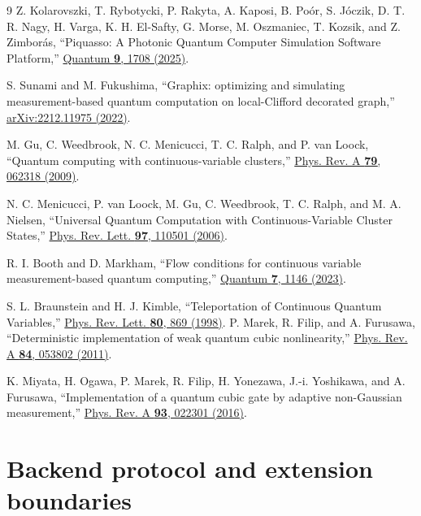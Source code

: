 \documentclass[a4paper,twocolumn,11pt,nopdfoutputerror]{quantumarticle}
\begin{document}
\begin{thebibliography}{9}
Z. Kolarovszki, T. Rybotycki, P. Rakyta, A. Kaposi, B. Po\'or, S. J\'oczik,
D. T. R. Nagy, H. Varga, K. H. El-Safty, G. Morse, M. Oszmaniec, T. Kozsik,
and Z. Zimbor\'as,
``Piquasso: A Photonic Quantum Computer Simulation Software Platform,''
\href{https://doi.org/10.22331/q-2025-04-15-1708}{Quantum \textbf{9}, 1708 (2025)}.

S. Sunami and M. Fukushima,
``Graphix: optimizing and simulating measurement-based quantum computation on
local-Clifford decorated graph,''
\href{https://arxiv.org/abs/2212.11975}{arXiv:2212.11975 (2022)}.

M. Gu, C. Weedbrook, N. C. Menicucci, T. C. Ralph, and P. van Loock,
``Quantum computing with continuous-variable clusters,''
\href{https://doi.org/10.1103/PhysRevA.79.062318}{Phys. Rev. A \textbf{79}, 062318 (2009)}.

N. C. Menicucci, P. van Loock, M. Gu, C. Weedbrook, T. C. Ralph, and M. A. Nielsen,
``Universal Quantum Computation with Continuous-Variable Cluster States,''
\href{https://doi.org/10.1103/PhysRevLett.97.110501}{Phys. Rev. Lett. \textbf{97}, 110501 (2006)}.

R. I. Booth and D. Markham,
``Flow conditions for continuous variable measurement-based quantum computing,''
\href{https://doi.org/10.22331/q-2023-10-19-1146}{Quantum \textbf{7}, 1146 (2023)}.

S. L. Braunstein and H. J. Kimble,
``Teleportation of Continuous Quantum Variables,''
\href{https://doi.org/10.1103/PhysRevLett.80.869}{Phys. Rev. Lett. \textbf{80}, 869 (1998)}.
P. Marek, R. Filip, and A. Furusawa,
``Deterministic implementation of weak quantum cubic nonlinearity,''
\href{https://doi.org/10.1103/PhysRevA.84.053802}{Phys. Rev. A \textbf{84}, 053802 (2011)}.

K. Miyata, H. Ogawa, P. Marek, R. Filip, H. Yonezawa, J.-i. Yoshikawa, and A. Furusawa,
``Implementation of a quantum cubic gate by adaptive non-Gaussian measurement,''
\href{https://doi.org/10.1103/PhysRevA.93.022301}{Phys. Rev. A \textbf{93}, 022301 (2016)}.
\end{thebibliography}

\appendix
\section{Backend protocol and extension boundaries}
\end{document}
